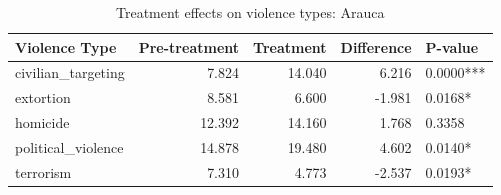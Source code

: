 \begin{table}

\caption{\label{tab:tab:treatment_arauca}Treatment effects on violence types: Arauca}
\centering
\begin{tabular}[t]{lrrrl}
\toprule
Violence Type & Pre-treatment & Treatment & Difference & P-value\\
\midrule
civilian\_targeting & 7.824 & 14.040 & 6.216 & 0.0000***\\
extortion & 8.581 & 6.600 & -1.981 & 0.0168*\\
homicide & 12.392 & 14.160 & 1.768 & 0.3358\\
political\_violence & 14.878 & 19.480 & 4.602 & 0.0140*\\
terrorism & 7.310 & 4.773 & -2.537 & 0.0193*\\
\bottomrule
\end{tabular}
\end{table}
